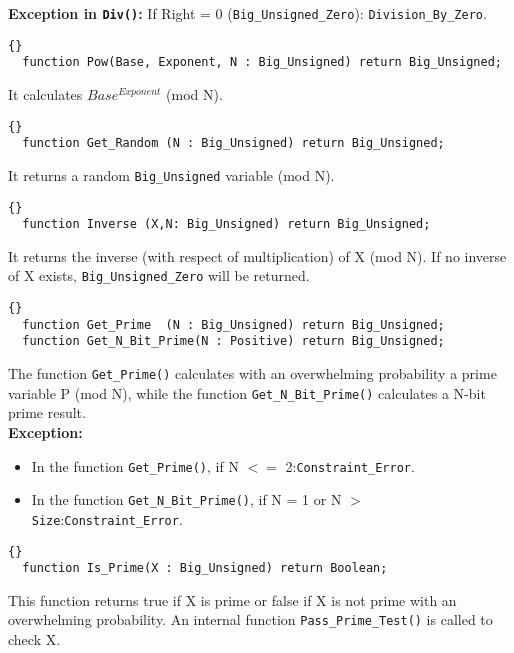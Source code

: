 \noindent\textbf{Exception in \texttt{Div()}:} If Right = 0
(\texttt{Big\_Unsigned\_Zero}): \texttt{Division\_By\_Zero}.


\hhline
\begin{lstlisting}{}
  function Pow(Base, Exponent, N : Big_Unsigned) return Big_Unsigned;
\end{lstlisting}
It calculates $Base^{Exponent}$ (mod N).

\hhline
\begin{lstlisting}{}
  function Get_Random (N : Big_Unsigned) return Big_Unsigned;
\end{lstlisting}
It returns a random \texttt{Big\_Unsigned} variable (mod N).

\hhline
\begin{lstlisting}{}
  function Inverse (X,N: Big_Unsigned) return Big_Unsigned;
\end{lstlisting}
It returns the inverse (with respect of multiplication) of X (mod
N). If no inverse of X exists, \texttt{Big\_Unsigned\_Zero} will be
returned.

\hhline
\begin{lstlisting}{}
  function Get_Prime  (N : Big_Unsigned) return Big_Unsigned;
  function Get_N_Bit_Prime(N : Positive) return Big_Unsigned;
\end{lstlisting}
The function \texttt{Get\_Prime()} calculates with an overwhelming
probability a prime variable P (mod N), while the function
\texttt{Get\_N\_Bit\_Prime()} calculates a N-bit prime result.\\

\noindent\textbf{Exception:}
\begin{itemize}
\item In the function \texttt{Get\_Prime()}, if N $<=$ 2:\quad\texttt{Constraint\_Error}.
\item In the function \texttt{Get\_N\_Bit\_Prime()}, if N = 1 or\; N $>$ \texttt{Size}:\quad\texttt{Constraint\_Error}.
\end{itemize}

\hhline
\begin{lstlisting}{}
  function Is_Prime(X : Big_Unsigned) return Boolean;
\end{lstlisting}
This function returns true if X is prime or false if X is not prime
with an overwhelming probability. An internal function
\texttt{Pass\_Prime\_Test()} is called to check X.\\

